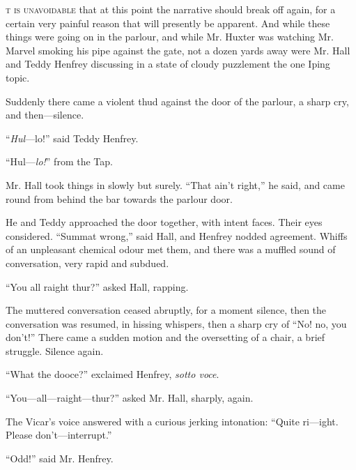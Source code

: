 \label{ch:12}
\begin{ChapterStart}
\vspace*{2\nbs}

\vspace{1.5\nbs}
\vspace{0.75\nbs}
\end{ChapterStart}

\kern-6pt\textsc{t is unavoidable} that at this point the narrative should break off again, for a certain very painful reason that will presently be apparent. And while these things were going on in the parlour, and while Mr. Huxter was watching Mr. Marvel smoking his pipe against the gate, not a dozen yards away were Mr. Hall and Teddy Henfrey discussing in a state of cloudy puzzlement the one Iping topic.

Suddenly there came a violent thud against the door of the parlour, a sharp cry, and then—silence.

“\emph{Hul}—lo!” said Teddy Henfrey.

“Hul—\emph{lo!}” from the Tap.

Mr. Hall took things in slowly but surely. “That ain’t right,” he said, and came round from behind the bar towards the parlour door.

He and Teddy approached the door together, with intent faces. Their eyes considered. “Summat wrong,” said Hall, and Henfrey nodded agreement. Whiffs of an unpleasant chemical odour met them, and there was a muffled sound of conversation, very rapid and subdued.

“You all raight thur?” asked Hall, rapping.

The muttered conversation ceased abruptly, for a moment silence, then the conversation was resumed, in hissing whispers, then a sharp cry of “No! no, you don’t!” There came a sudden motion and the oversetting of a chair, a brief struggle. Silence again.

“What the dooce?” exclaimed Henfrey, \emph{sotto voce}.

“You—all—raight—thur?” asked Mr. Hall, sharply, again.

The Vicar’s voice answered with a curious jerking intonation: “Quite ri—ight. Please don’t—interrupt.”

“Odd!” said Mr. Henfrey.


